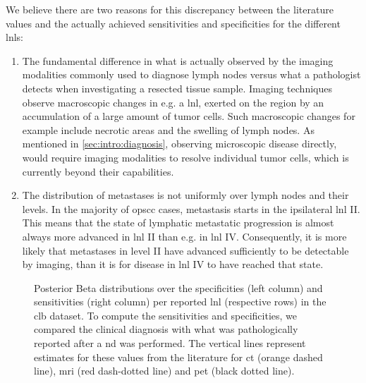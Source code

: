 \documentclass[\relativeRoot/main.tex]{subfiles}
\begin{document}
We believe there are two reasons for this discrepancy between the literature values and the actually achieved sensitivities and specificities for the different \glspl{lnl}:

\begin{enumerate}
    \item The fundamental difference in what is actually observed by the imaging modalities commonly used to diagnose lymph nodes versus what a pathologist detects when investigating a resected tissue sample. Imaging techniques observe macroscopic changes in e.g. a \gls{lnl}, exerted on the region by an accumulation of a large amount of tumor cells. Such macroscopic changes for example include necrotic areas and the swelling of lymph nodes. As mentioned in \cref{sec:intro:diagnosis}, observing microscopic disease directly, would require imaging modalities to resolve individual tumor cells, which is currently beyond their capabilities.
    \item The distribution of metastases is not uniformly over lymph nodes and their levels. In the majority of \gls{opscc} cases, metastasis starts in the ipsilateral \gls{lnl} II. This means that the state of lymphatic metastatic progression is almost always more advanced in \gls{lnl} II than e.g. in \gls{lnl} IV. Consequently, it is more likely that metastases in level II have advanced sufficiently to be detectable by imaging, than it is for disease in \gls{lnl} IV to have reached that state.
\end{enumerate}

\begin{figure}
    \centering
    \def\svgwidth{1.0\textwidth}
    
    \caption[
        Sensitivity and specificity per LNL in the CLB dataset
    ]{
        Posterior Beta distributions over the specificities (left column) and sensitivities (right column) per reported \gls{lnl} (respective rows) in the \gls{clb} dataset. To compute the sensitivities and specificities, we compared the clinical diagnosis with what was pathologically reported after a \acrlong{nd} was performed. The vertical lines represent estimates for these values from the literature \cite{de_bondt_detection_2007,kyzas_18f-fluorodeoxyglucose_2008} for \gls{ct} (orange dashed line), \gls{mri} (red dash-dotted line) and \gls{pet} (black dotted line).
    }
    \label{fig:dataset_clb:sens_spec}
\end{figure}
\end{document}

